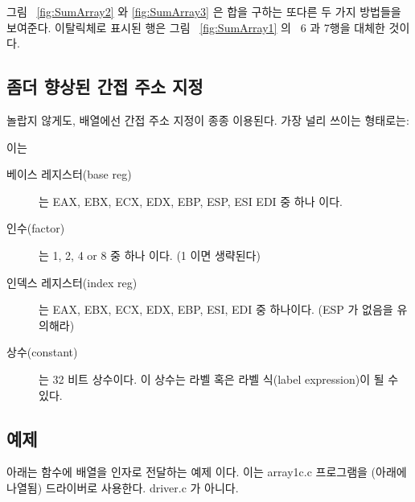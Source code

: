 그림 ~\ref{fig:SumArray2} 와 \ref{fig:SumArray3} 은 합을 구하는 또다른 두 가지 
방법들을 보여준다. 이탈릭체로 표시된 행은 그림 ~\ref{fig:SumArray1} 의 
~6 과 7행을 대체한 것이다. 

\subsection{좀더 향상된 간접 주소 지정}

놀랍지 않게도, 배열에선 간접 주소 지정이 종종 이용된다. 가장 널리 쓰이는
형태로는:

\begin{center}
{}
\end{center}
이는
\begin{description}
\item[베이스 레지스터(base reg)] 는 EAX, EBX, ECX, EDX, EBP, ESP, ESI
                EDI 중 하나 이다.
\item[인수(factor)]는 1, 2, 4 or 8 중 하나 이다. (1 이면 생략된다)
\item[인덱스 레지스터(index reg)] 는 EAX, EBX, ECX, EDX, EBP, ESI, EDI 중 하나이다.
                 (ESP 가 없음을 유의해라)
\item[상수(constant)] 는 32 비트 상수이다. 이 상수는 라벨 혹은 
                라벨 식(label expression)이 될 수 있다.
\end{description}

\subsection{예제}

아래는 함수에 배열을 인자로 전달하는 예제 이다. 이는 {\code array1c.c} 프로그램을
(아래에 나열됨) 드라이버로 사용한다. {\code driver.c} 가 아니다. 

